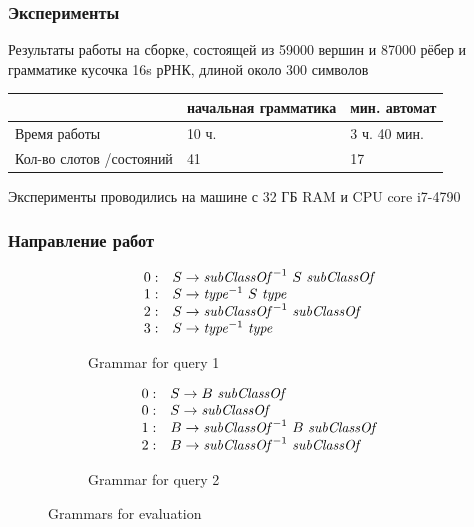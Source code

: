 \documentclass{beamer}
\begin{document}
    \begin{frame}
        \frametitle{Эксперименты}
        Результаты работы на сборке, состоящей из 59000 вершин и 87000 рёбер
        и грамматике кусочка 16s рРНК, длиной около 300 символов
        \begin{center}
            \begin{tabular}{ p{2.5cm} | p{2cm} | p{2.5cm}}
                & начальная грамматика & мин. автомат \\ \hline
                Время работы                & 10 ч.                & 3 ч. 40 мин. \\ \hline
                Кол-во слотов /состояний    & 41                   & 17           \\ \hline
            \end{tabular}
        \end{center}
        Эксперименты проводились на машине с 32 ГБ RAM и CPU core i7-4790
    \end{frame}
    
\begin{frame}
\frametitle{Направление работ}
    \begin{figure}%
   \begin{center}
   \centering
   \begin{subfigure}[b]{0.4\textwidth}
   \[
\begin{array}{rl}
   0: & S \rightarrow \text{\textit{subClassOf}}^{-1} \ S \ \text{\textit{subClassOf}} \\ 
   1: & S \rightarrow \text{\textit{type}}^{-1} \ S \ \text{\textit{type}} \\ 
   2: & S \rightarrow \text{\textit{subClassOf}}^{-1} \ \text{\textit{subClassOf}} \\ 
   3: & S \rightarrow \text{\textit{type}}^{-1} \ \text{\textit{type}} \\ 
\end{array}
\]
   \caption{Grammar for query 1}
   \label{grammarQ1}
   \end{subfigure}
   \hspace{2em}
   \begin{subfigure}[b]{0.4\textwidth}
   \[
\begin{array}{rl}
   0: & S \rightarrow B \ \text{\textit{subClassOf}} \\ 
   0: & S \rightarrow \text{\textit{subClassOf}} \\ 
   1: & B \rightarrow \text{\textit{subClassOf}}^{-1} \ B \ \text{\textit{subClassOf}} \\
   2: & B \rightarrow \text{\textit{subClassOf}}^{-1} \ \text{\textit{subClassOf}} \\ 
\end{array}
\]
   \caption{Grammar for query 2}
   \label{grammarQ2}        
   \end{subfigure}
   \end{center}
   \caption{Grammars for evaluation}
    \label{GrammarsForEvaluation}
\end{figure}
\end{frame}
    
\end{document}
